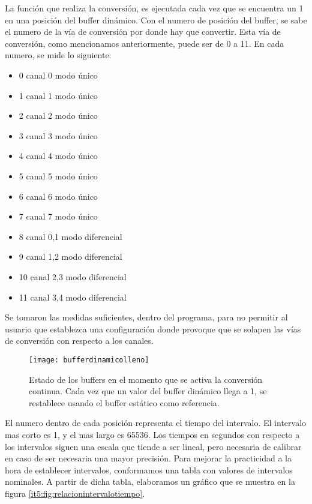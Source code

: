 La función que realiza la conversión, es ejecutada cada vez que se encuentra un 1 en una posición del buffer dinámico. Con el numero de posición del buffer, se sabe el numero de la vía de conversión por donde hay que convertir. Esta vía de conversión, como mencionamos anteriormente, puede ser de 0 a 11. En cada numero, se mide lo siguiente:

\begin{itemize}
\item 0 \textrightarrow  canal 0 modo único
\item 1 \textrightarrow  canal 1 modo único
\item 2 \textrightarrow  canal 2 modo único
\item 3 \textrightarrow  canal 3 modo único
\item 4 \textrightarrow  canal 4 modo único
\item 5 \textrightarrow  canal 5 modo único
\item 6 \textrightarrow  canal 6 modo único
\item 7 \textrightarrow  canal 7 modo único
\item 8 \textrightarrow  canal 0,1 modo diferencial
\item 9 \textrightarrow  canal 1,2 modo diferencial
\item 10 \textrightarrow  canal 2,3 modo diferencial
\item 11 \textrightarrow  canal 3,4 modo diferencial
\end{itemize}

Se tomaron las medidas suficientes, dentro del programa, para no permitir al usuario que establezca una configuración donde provoque que se solapen las vías de conversión con respecto a los canales. 

\begin{figure}[h]
  \centering
  \texttt{[image: bufferdinamicolleno]}
  \caption{Estado de los buffers en el momento que se activa la conversión continua. Cada vez que un valor del buffer dinámico llega a 1, se restablece usando el buffer estático como referencia.}\label{it5:fig:bufferdinamicolleno}
\end{figure}

El numero dentro de cada posición representa el tiempo del intervalo. El intervalo mas corto es 1, y el mas largo es 65536. Los tiempos en segundos con respecto a los intervalos siguen una escala que tiende a ser lineal, pero necesaria de calibrar en caso de ser necesaria una mayor precisión. Para mejorar la practicidad a la hora de establecer intervalos, conformamos una tabla con valores de intervalos nominales. A partir de dicha tabla, elaboramos un gráfico que se muestra en la figura \ref{it5:fig:relacionintervalotiempo}.

